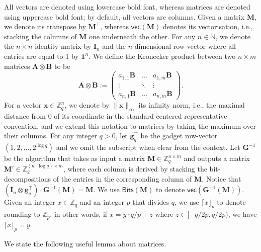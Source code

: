 \documentclass{theoretics}
\newcommand{\N}{\mathbb{N}}
\newcommand{\Z}{\mathbb{Z}}
\newcommand{\id}{\ensuremath{\mathbf{I}}}
\begin{document}
All vectors are denoted using lowercase bold font, whereas matrices are denoted using uppercase bold font; by default, all vectors are columns.
Given a matrix $\mathbf{M}$, we denote its transpose by $\mathbf{M}^\intercal$, whereas $\mathsf{vec}(\mathbf{M})$ denotes its vectorisation, i.e., stacking the columns of $\mathbf{M}$ one underneath the other. For any $n\in\N$, we denote the $n\times n$ identity matrix by $\id_n$ and the $n$-dimensional row vector where all entries are equal to 1 by $\mathbf{1}^n$. We define the Kronecker product between two $n\times m$ matrices $\mathbf{A} \otimes \mathbf{B}$ to be
\[
\mathbf{A} \otimes \mathbf{B} := \begin{pmatrix}
    a_{1,1}\mathbf{B} &\dots& a_{1,m}\mathbf{B}\\
    \vdots &\ddots& \vdots\\
    a_{n,1}\mathbf{B} &\dots& a_{n,m}\mathbf{B}
\end{pmatrix}.
\]
For a vector $\mathbf{x}\in \Z_q^n$, we denote by $\|\mathbf{x}\|_{\infty}$ its infinity norm, i.e., {the maximal distance from $0$ of its coordinate in the standard centered representative convention,} and we extend this notation to matrices by taking the maximum over their columns. 
For any integer $q>0$, let $\mathbf{g}_q^\intercal$ be the gadget row-vector $(1, 2, \dots, 2^{\log q})$ and we omit the subscript when clear from the context. Let $\mathbf{G}^{-1}$ be the algorithm that takes as input a matrix $\mathbf{M}\in\Z_q^{n\times m}$ and outputs a matrix $\mathbf{M}'\in\Z_2^{(n\cdot \log q)\times m}$, where each column is derived by stacking the bit-decompositions of the entries in the corresponding column of $\mathbf{M}$. Notice that $(\id_n\otimes \mathbf{g}_q^\intercal)\cdot \mathbf{G}^{-1}(\mathbf{M})=\mathbf{M}$. We use $\mathsf{Bits}(\mathbf{M})$ to denote $\mathsf{vec}(\mathbf{G}^{-1}(\mathbf{M}))$.
Given an integer $x\in\Z_q$ and an integer $p$ that divides $q$, we use $\lceil x \rfloor_p$ to denote rounding to $\Z_p$, in other words, if $x=y\cdot q/p+z$ where $ z\in[ -q/2p, q/2p)$, we have $\lceil x \rfloor_p=y$.

We state the following useful lemma about matrices.
\end{document}
